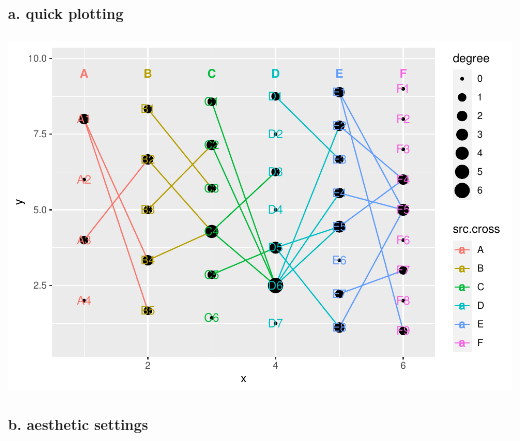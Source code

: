 \documentclass[
]{article}
\newenvironment{Shaded}{\begin{snugshade}}{\end{snugshade}}
\newcommand{\KeywordTok}[1]{\textcolor[rgb]{0.13,0.29,0.53}{\textbf{#1}}}
\newcommand{\NormalTok}[1]{#1}
\newcommand{\OperatorTok}[1]{\textcolor[rgb]{0.81,0.36,0.00}{\textbf{#1}}}
\newcommand{\StringTok}[1]{\textcolor[rgb]{0.31,0.60,0.02}{#1}}
\let\oldparagraph\paragraph
\renewcommand{\paragraph}[1]{\oldparagraph{#1}\mbox{}}
\begin{document}
\hypertarget{a.-quick-plotting}{%
\paragraph{a. quick plotting}\label{a.-quick-plotting}}

\begin{Shaded}
\end{Shaded}

\includegraphics{ReadMe1_files/figure-latex/unnamed-chunk-8-1.pdf}

\hypertarget{b.-aesthetic-settings}{%
\paragraph{b. aesthetic settings}\label{b.-aesthetic-settings}}
\end{document}
